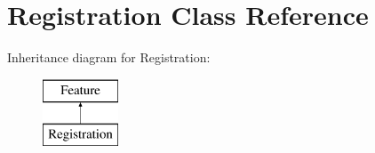 \hypertarget{class_registration}{}\section{Registration Class Reference}
\label{class_registration}
Inheritance diagram for Registration\+:\begin{figure}[H]
\begin{center}
\leavevmode
\includegraphics[height=2.000000cm]{class_registration}
\end{center}
\end{figure}
